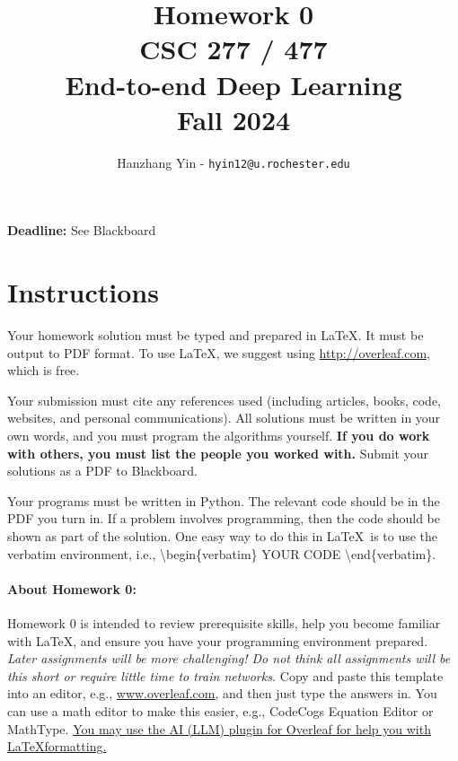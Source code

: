 \documentclass[11pt, oneside]{article}   	%
\title{Homework 0 \\ CSC 277 / 477 \\ End-to-end Deep Learning \\ Fall 2024}
\author{Hanzhang Yin - \texttt{hyin12@u.rochester.edu}}
\date{}
\begin{document}
\maketitle

\begin{center}
    \textbf{Deadline:} See Blackboard    
\end{center}


\section*{Instructions}

Your homework solution must be typed and prepared in \LaTeX. It must be output to PDF format. To use \LaTeX, we suggest using \url{http://overleaf.com}, which is free.

Your submission must cite any references used (including articles, books, code, websites, and personal communications).  All solutions must be written in your own words, and you must program the algorithms yourself. \textbf{If you do work with others, you must list the people you worked with.} Submit your solutions as a PDF to Blackboard. 


Your programs must be written in Python. The relevant code should be in the PDF you turn in. If a problem involves programming, then the code should be shown as part of the solution. One easy way to do this in \LaTeX \, is to use the verbatim environment, i.e., \textbackslash begin\{verbatim\} YOUR CODE \textbackslash end\{verbatim\}.




\paragraph{About Homework 0:} Homework 0 is intended to review prerequisite skills, help you become familiar with LaTeX, and ensure you have your programming environment prepared. \emph{Later assignments will be more challenging! Do not think all assignments will be this short or require little time to train networks.} Copy and paste this template into an editor, e.g., \url{www.overleaf.com}, and then just type the answers in. You can use a math editor to make this easier, e.g., CodeCogs Equation Editor or MathType. \hyperlink{https://blog.writefull.com/texgpt-harness-the-power-of-chatgpt-in-overleaf/}{You may use the AI (LLM) plugin for Overleaf for help you with \LaTeX formatting.}
\end{document}
